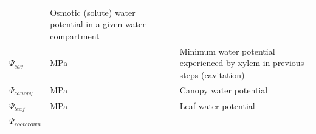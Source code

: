 \documentclass[]{book}
\begin{document}
\begin{longtable}[]{@{}llll@{}}
\begin{minipage}[t]{0.12\columnwidth}
\strut
\end{minipage} & \begin{minipage}[t]{0.45\columnwidth}\raggedright\strut
Osmotic (solute) water potential in a given water compartment\strut
\end{minipage}\tabularnewline
\begin{minipage}[t]{0.11\columnwidth}\raggedright\strut
\(\Psi_{cav}\)\strut
\end{minipage} & \begin{minipage}[t]{0.10\columnwidth}\raggedright\strut
MPa\strut
\end{minipage} & \begin{minipage}[t]{0.12\columnwidth}\raggedright\strut
\strut
\end{minipage} & \begin{minipage}[t]{0.45\columnwidth}\raggedright\strut
Minimum water potential experienced by xylem in previous steps
(cavitation)\strut
\end{minipage}\tabularnewline
\begin{minipage}[t]{0.11\columnwidth}\raggedright\strut
\(\Psi_{canopy}\)\strut
\end{minipage} & \begin{minipage}[t]{0.10\columnwidth}\raggedright\strut
MPa\strut
\end{minipage} & \begin{minipage}[t]{0.12\columnwidth}\raggedright\strut
\strut
\end{minipage} & \begin{minipage}[t]{0.45\columnwidth}\raggedright\strut
Canopy water potential\strut
\end{minipage}\tabularnewline
\begin{minipage}[t]{0.11\columnwidth}\raggedright\strut
\(\Psi_{leaf}\)\strut
\end{minipage} & \begin{minipage}[t]{0.10\columnwidth}\raggedright\strut
MPa\strut
\end{minipage} & \begin{minipage}[t]{0.12\columnwidth}\raggedright\strut
\strut
\end{minipage} & \begin{minipage}[t]{0.45\columnwidth}\raggedright\strut
Leaf water potential\strut
\end{minipage}\tabularnewline
\begin{minipage}[t]{0.11\columnwidth}\raggedright\strut
\(\Psi_{rootcrown}\)\strut
\end{minipage} & \begin{minipage}[t]{0.10\columnwidth}\raggedright\strut

\end{minipage}
\end{longtable}
\end{document}
